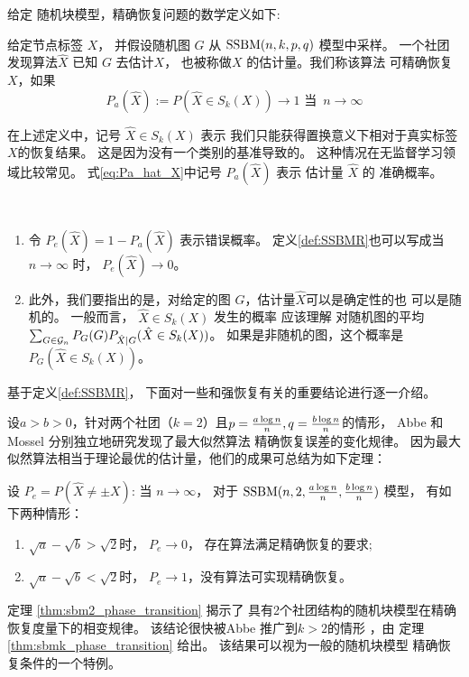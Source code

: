 给定 随机块模型，精确恢复问题的数学定义如下:
\begin{definition} \label{def:SSBMR}
给定节点标签 $X$， 并假设随机图 $G$ 从 $\operatorname{SSBM}(n,k,p,q)   $ 模型中采样。
一个社团发现算法$\hat{X}$ 已知 $G$ 去估计$X$，
也被称做$X$ 的估计量。我们称该算法
可精确恢复$X$，如果
\begin{equation}\label{eq:Pa_hat_X}
P_a(\hat{X}):=P(\hat{X} \in S_k(X)) \to 1 \textrm{ 当 }\, n \to \infty
\end{equation}
\end{definition}

在上述定义中，记号 $\hat{X} \in S_k(X)$ 表示
我们只能获得置换意义下相对于真实标签$X$的恢复结果。
这是因为没有一个类别的基准导致的。
这种情况在无监督学习领域比较常见。
式\eqref{eq:Pa_hat_X}中记号 $P_a(\hat{X})$
表示 估计量 $\hat{X}$ 的
准确概率。
\begin{remark}\label{rem:metric_exact_recovery}\,
  \begin{enumerate}
    \item 令 $P_e(\hat{X}) = 1 - P_a(\hat{X})$
    表示错误概率。
    定义\ref{def:SSBMR}也可以写成当$n\to \infty$
    时，
    $P_e(\hat{X}) \to 0$。
  \item  此外，我们要指出的是，对给定的图 $G$，估计量$\hat{X}$可以是确定性的也
  可以是随机的。
  一般而言， $\hat{X} \in S_k(X)$ 发生的概率 应该理解
  对随机图的平均 $\sum_{G \in \mathcal{G}_n} P_G(G) P_{\hat{X}|G}(\hat{X} \in S_k(X))$。 
  如果是非随机的图，这个概率是 $P_G(\hat{X} \in S_k(X))$。  
  \end{enumerate}
\end{remark}

基于定义\ref{def:SSBMR}，
下面对一些和强恢复有关的重要结论进行逐一介绍。

设$a>b>0$，针对两个社团（$k=2$）且$p=\frac{a \log n}{n},q=\frac{b \log n}{n}$的情形，
Abbe \cite{abbe2015exact} 和 Mossel
\cite{mossel2016} 分别独立地研究发现了最大似然算法
精确恢复误差的变化规律。
因为最大似然算法相当于理论最优的估计量，他们的成果可总结为如下定理：
\begin{theorem}\label{thm:sbm2_phase_transition}
设 $P_e=P(\hat{X} \neq \pm X)$: 当 $n \to \infty$，
对于 $\operatorname{SSBM}(n,2,\frac{a \log n}{n}, \frac{b \log n}{n})$ 模型，
有如下两种情形：
	\begin{enumerate}
		\item $\sqrt{a} - \sqrt{b} > \sqrt{2}$时，
    $P_e \to 0$， 存在算法满足精确恢复的要求;
		\item $\sqrt{a} - \sqrt{b} < \sqrt{2}$时，
    $P_e \to 1$，没有算法可实现精确恢复。
	\end{enumerate}
\end{theorem}
定理 \ref{thm:sbm2_phase_transition} 揭示了
具有2个社团结构的随机块模型在精确恢复度量下的相变规律。
该结论很快被Abbe 推广到$k>2$的情形
\cite{abbe2015community}，由
定理 \ref{thm:sbmk_phase_transition} 给出。
该结果可以视为一般的随机块模型
精确恢复条件的一个特例。

